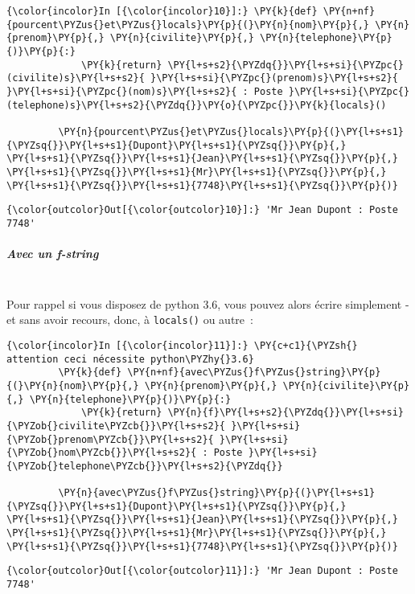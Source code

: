     \begin{Verbatim}[commandchars=\\\{\}]
{\color{incolor}In [{\color{incolor}10}]:} \PY{k}{def} \PY{n+nf}{pourcent\PYZus{}et\PYZus{}locals}\PY{p}{(}\PY{n}{nom}\PY{p}{,} \PY{n}{prenom}\PY{p}{,} \PY{n}{civilite}\PY{p}{,} \PY{n}{telephone}\PY{p}{)}\PY{p}{:}
             \PY{k}{return} \PY{l+s+s2}{\PYZdq{}}\PY{l+s+si}{\PYZpc{}(civilite)s}\PY{l+s+s2}{ }\PY{l+s+si}{\PYZpc{}(prenom)s}\PY{l+s+s2}{ }\PY{l+s+si}{\PYZpc{}(nom)s}\PY{l+s+s2}{ : Poste }\PY{l+s+si}{\PYZpc{}(telephone)s}\PY{l+s+s2}{\PYZdq{}}\PY{o}{\PYZpc{}}\PY{k}{locals}()
         
         \PY{n}{pourcent\PYZus{}et\PYZus{}locals}\PY{p}{(}\PY{l+s+s1}{\PYZsq{}}\PY{l+s+s1}{Dupont}\PY{l+s+s1}{\PYZsq{}}\PY{p}{,} \PY{l+s+s1}{\PYZsq{}}\PY{l+s+s1}{Jean}\PY{l+s+s1}{\PYZsq{}}\PY{p}{,} \PY{l+s+s1}{\PYZsq{}}\PY{l+s+s1}{Mr}\PY{l+s+s1}{\PYZsq{}}\PY{p}{,} \PY{l+s+s1}{\PYZsq{}}\PY{l+s+s1}{7748}\PY{l+s+s1}{\PYZsq{}}\PY{p}{)}
\end{Verbatim}


\begin{Verbatim}[commandchars=\\\{\}]
{\color{outcolor}Out[{\color{outcolor}10}]:} 'Mr Jean Dupont : Poste 7748'
\end{Verbatim}
            
    \hypertarget{avec-un-f-string}{%
\subparagraph{\texorpdfstring{Avec un
\emph{f-string}}{Avec un f-string}\\\\}\label{avec-un-f-string}}

    Pour rappel si vous disposez de python 3.6, vous pouvez alors écrire
simplement - et sans avoir recours, donc, à \texttt{locals()} ou autre~:

    \begin{Verbatim}[commandchars=\\\{\}]
{\color{incolor}In [{\color{incolor}11}]:} \PY{c+c1}{\PYZsh{} attention ceci nécessite python\PYZhy{}3.6}
         \PY{k}{def} \PY{n+nf}{avec\PYZus{}f\PYZus{}string}\PY{p}{(}\PY{n}{nom}\PY{p}{,} \PY{n}{prenom}\PY{p}{,} \PY{n}{civilite}\PY{p}{,} \PY{n}{telephone}\PY{p}{)}\PY{p}{:}
             \PY{k}{return} \PY{n}{f}\PY{l+s+s2}{\PYZdq{}}\PY{l+s+si}{\PYZob{}civilite\PYZcb{}}\PY{l+s+s2}{ }\PY{l+s+si}{\PYZob{}prenom\PYZcb{}}\PY{l+s+s2}{ }\PY{l+s+si}{\PYZob{}nom\PYZcb{}}\PY{l+s+s2}{ : Poste }\PY{l+s+si}{\PYZob{}telephone\PYZcb{}}\PY{l+s+s2}{\PYZdq{}}
         
         \PY{n}{avec\PYZus{}f\PYZus{}string}\PY{p}{(}\PY{l+s+s1}{\PYZsq{}}\PY{l+s+s1}{Dupont}\PY{l+s+s1}{\PYZsq{}}\PY{p}{,} \PY{l+s+s1}{\PYZsq{}}\PY{l+s+s1}{Jean}\PY{l+s+s1}{\PYZsq{}}\PY{p}{,} \PY{l+s+s1}{\PYZsq{}}\PY{l+s+s1}{Mr}\PY{l+s+s1}{\PYZsq{}}\PY{p}{,} \PY{l+s+s1}{\PYZsq{}}\PY{l+s+s1}{7748}\PY{l+s+s1}{\PYZsq{}}\PY{p}{)}
\end{Verbatim}


\begin{Verbatim}[commandchars=\\\{\}]
{\color{outcolor}Out[{\color{outcolor}11}]:} 'Mr Jean Dupont : Poste 7748'
\end{Verbatim}